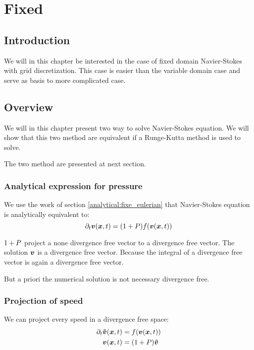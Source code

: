 \chapter{Fixed}
\minitoc
\section{Introduction}

We will in this chapter be interested in the case of fixed domain Navier-Stokes with grid discretization.
This case is easier than the variable domain case and serve as basis to more complicated case.

\section{Overview}

We will in this chapter present two way to solve Navier-Stokes equation.
We will show that this two method are equivalent if a Runge-Kutta method is used to solve.

The two method are presented at next section.
\subsection{Analytical expression for pressure}
\label{fixed:analytical}

We use the work of section \ref{analytical:fixe_eulerian} that Navier-Stokes equation is analytically equivalent to:
\begin{equation}
  \partial_t {\boldsymbol {v}}({\boldsymbol {x}} ,t)=(1+P)f({\boldsymbol {v}}({\boldsymbol {x}},t))
\end{equation}

$1+P$ project a none divergence free vector to a divergence free vector.
The solution ${\boldsymbol {v}}$ is a divergence free vector. Because the integral of a divergence free vector is again a divergence free vector.

But a priori the numerical solution is not necessary divergence free.

\subsection{Projection of speed}
\label{fixed:proj}

We can project every speed in a divergence free space:
\begin{subequations}
\begin{align}
  \partial_t {\boldsymbol {\tilde{v}}}({\boldsymbol {x}} ,t)&=f({\boldsymbol {v}}({\boldsymbol {x}},t))\\
  {\boldsymbol {v}}({\boldsymbol {x}},t)&=(1+P){\boldsymbol {\tilde{v}}}
\end{align}
\end{subequations}

